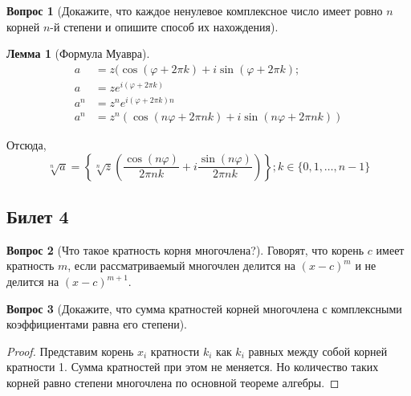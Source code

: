 \documentclass[a4paper,11pt]{article}
\newtheorem*{lemma}{Лемма}
\theoremstyle{remark}
\theoremstyle{definition}
\newtheorem{question}{Вопрос}
\numberwithin{question}{subsection}
\begin{document}
\begin{question}[Докажите, что каждое ненулевое комплексное число имеет ровно \(n\) корней \(n\)-й степени и опишите способ их нахождения]
\begin{lemma}[Формула Муавра]\(\)
\begin{align*}
	a &= z(\cos(\varphi + 2\pi{}k) + i\sin(\varphi + 2\pi{}k); \\
	a &= ze^{i(\varphi + 2\pi{}k)} \\
	a^n &= z^ne^{i(\varphi + 2\pi{}k)n} \\
	a^n &= z^n(\cos(n\varphi + 2\pi{}nk) + i\sin(n\varphi + 2\pi{}nk))
\end{align*}
\end{lemma}
Отсюда,
\begin{equation*}
	\sqrt[n]{a} = \left\{\sqrt[n]{z}\left(\dfrac{\cos(n\varphi)}{2\pi{}nk} + i\dfrac{\sin(n\varphi)}{2\pi{}nk}\right)\right\}; k \in \{0, 1, \dots, n-1\}
\end{equation*}
\end{question}


\subsection{Билет 4}
\begin{question}[Что такое кратность корня многочлена?]
Говорят, что корень \(c\) имеет кратность \(m\), если рассматриваемый многочлен делится на \((x-c)^m\) и не делится на \((x-c)^{m+1}\).
\end{question}


\begin{question}[Докажите, что сумма кратностей корней многочлена с комплексными коэффициентами равна его степени]\(\)
\begin{proof}
Представим корень \(x_i\) кратности \(k_i\) как \(k_i\) равных между собой корней кратности 1. Сумма кратностей при этом не меняется. Но количество таких корней равно степени многочлена по основной теореме алгебры.
\end{proof}
\end{question}
\end{document}
